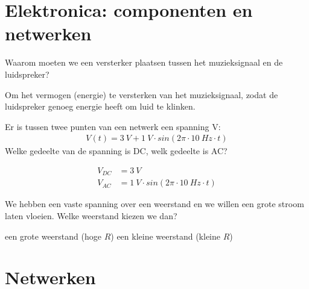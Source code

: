 \documentclass{exam}
\begin{document}
\maketitle
	\printanswers


	\begin{questions}
\section{Elektronica: componenten en netwerken}

		\question 
			Waarom moeten we een versterker plaatsen tussen het muzieksignaal en de luidspreker?
			\begin{solutionordottedlines}[0.5in]
				Om het vermogen (energie) te versterken van het muzieksignaal, zodat de luidspreker genoeg energie heeft om luid te klinken.
			\end{solutionordottedlines}

		\question 
			Er is tussen twee punten van een netwerk een spanning V:
			\begin{align*}
			    V(t)  = 3~V + 1~V \cdot sin(2\pi \cdot 10~Hz \cdot t)
			\end{align*}
			Welke gedeelte van de spanning is DC, welk gedeelte is AC?
			
			\begin{solutionordottedlines}[0.5in]
				\begin{align*}
					V_{DC} &= 3~V \\
					V_{AC} &= 1~V \cdot sin(2\pi \cdot 10~Hz \cdot t)
				\end{align*} 
			\end{solutionordottedlines}

		\question 
			We hebben een vaste spanning over een weerstand en we willen een grote stroom laten vloeien. Welke weerstand kiezen we dan?
			\begin{choices}
				\choice een grote weerstand (hoge $R$)
				\CorrectChoice een kleine weerstand (kleine $R$)
			\end{choices}

\section{Netwerken}
		

\end{questions}
\end{document}
